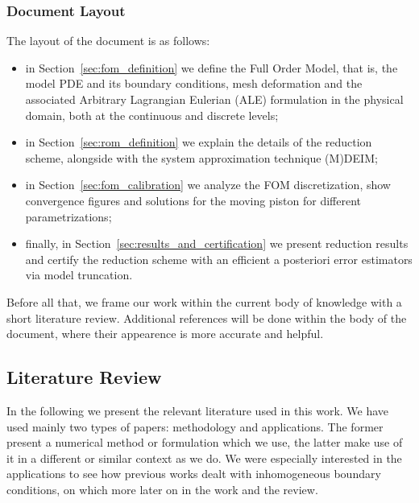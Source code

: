 \documentclass[thesis.tex]{subfiles}
\begin{document}
\subsubsection{Document Layout}
The layout of the document is as follows:
\begin{itemize}
    \item in Section~\ref{sec:fom_definition} we define the Full Order Model, that is, 
    the model PDE and its boundary conditions, 
    mesh deformation and the associated Arbitrary Lagrangian Eulerian (ALE) formulation
    in the physical domain,
    both at the continuous and discrete levels;
    \item in Section~\ref{sec:rom_definition} we explain the details of the reduction scheme, 
    alongside with the system approximation technique (M)DEIM;
    \item in Section~\ref{sec:fom_calibration} we analyze the FOM discretization, 
    show convergence figures and solutions for the moving piston for different parametrizations;
    \item finally, in Section~\ref{sec:results_and_certification} we present reduction results
    and certify the reduction scheme with an efficient a posteriori error estimators via model truncation.
\end{itemize}
Before all that, we frame our work within the current body of knowledge 
with a short literature review.
Additional references will be done within the body of the document, 
where their appearence is more accurate and helpful.  

\subsection{Literature Review}
In the following we present the relevant literature used in this work.
We have used mainly two types of papers: 
methodology and applications.
The former present a numerical method or formulation 
which we use, 
the latter make use of it in a different or similar context as we do.
We were especially interested in the applications to see how
previous works dealt with inhomogeneous boundary conditions,
on which more later on in the work and the review.
\end{document}
